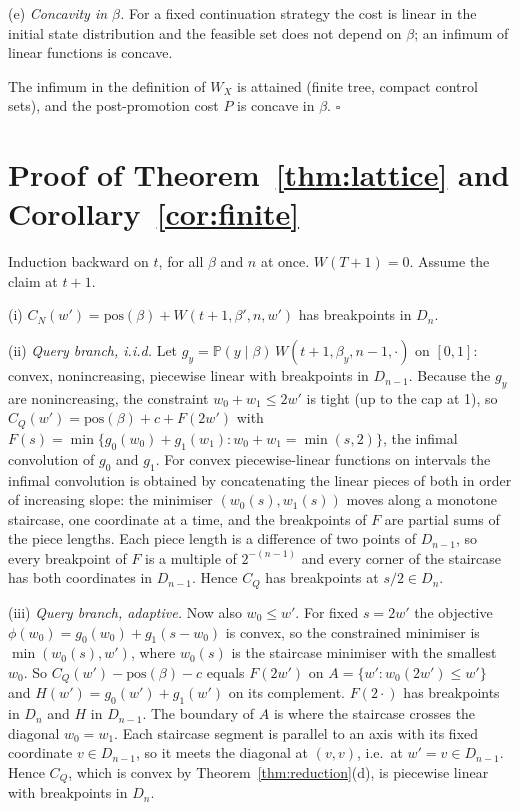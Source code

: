 \documentclass{article}
\theoremstyle{plain}
\theoremstyle{definition}
\theoremstyle{remark}
\newcommand{\PP}{\mathbb{P}}
\newcommand{\pos}{\mathrm{pos}}
\begin{document}
(e) \emph{Concavity in $\beta$.} For a fixed continuation strategy the cost is linear in the initial state distribution and the feasible set does not depend on $\beta$; an infimum of linear functions is concave.

The infimum in the definition of $W_X$ is attained (finite tree, compact control sets), and the post-promotion cost $P$ is concave in $\beta$. \hfill$\square$

\section{Proof of Theorem~\ref{thm:lattice} and Corollary~\ref{cor:finite}}
\label{app:lattice}

Induction backward on $t$, for all $\beta$ and $n$ at once. $W(T+1)=0$. Assume the claim at $t+1$.

(i) $C_N(w')=\pos(\beta)+W(t+1,\beta',n,w')$ has breakpoints in $D_n$.

(ii) \emph{Query branch, i.i.d.} Let $g_y=\PP(y\mid\beta)\,W(t+1,\beta_y,n-1,\cdot)$ on $[0,1]$: convex, nonincreasing, piecewise linear with breakpoints in $D_{n-1}$. Because the $g_y$ are nonincreasing, the constraint $w_0+w_1\le2w'$ is tight (up to the cap at 1), so $C_Q(w')=\pos(\beta)+c+F(2w')$ with $F(s)=\min\{g_0(w_0)+g_1(w_1):w_0+w_1=\min(s,2)\}$, the infimal convolution of $g_0$ and $g_1$. For convex piecewise-linear functions on intervals the infimal convolution is obtained by concatenating the linear pieces of both in order of increasing slope: the minimiser $(w_0(s),w_1(s))$ moves along a monotone staircase, one coordinate at a time, and the breakpoints of $F$ are partial sums of the piece lengths. Each piece length is a difference of two points of $D_{n-1}$, so every breakpoint of $F$ is a multiple of $2^{-(n-1)}$ and every corner of the staircase has both coordinates in $D_{n-1}$. Hence $C_Q$ has breakpoints at $s/2\in D_n$.

(iii) \emph{Query branch, adaptive.} Now also $w_0\le w'$. For fixed $s=2w'$ the objective $\phi(w_0)=g_0(w_0)+g_1(s-w_0)$ is convex, so the constrained minimiser is $\min(w_0(s),w')$, where $w_0(s)$ is the staircase minimiser with the smallest $w_0$. So $C_Q(w')-\pos(\beta)-c$ equals $F(2w')$ on $A=\{w':w_0(2w')\le w'\}$ and $H(w')=g_0(w')+g_1(w')$ on its complement. $F(2\cdot)$ has breakpoints in $D_n$ and $H$ in $D_{n-1}$. The boundary of $A$ is where the staircase crosses the diagonal $w_0=w_1$. Each staircase segment is parallel to an axis with its fixed coordinate $v\in D_{n-1}$, so it meets the diagonal at $(v,v)$, i.e.\ at $w'=v\in D_{n-1}$. Hence $C_Q$, which is convex by Theorem~\ref{thm:reduction}(d), is piecewise linear with breakpoints in $D_n$.
\end{document}
